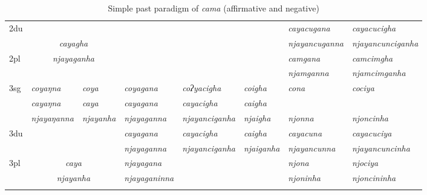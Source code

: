 \begin{sidewaystable}[p]
{\begin{tabular}{l|p{2.4cm}|p{1.5cm}|p{2.4cm}|p{2.4cm}|p{2.4cm}|p{3.2cm}|p{3.2cm}}
 \cline{1-2} \cline{7-8}			
{\sc 2du}		& \multicolumn{2}{c|}{}     & \multicolumn{3}{c|}{\cellcolor[gray]{.8}} & \it  cayacugana  & \it   cayacucigha \\
		& \multicolumn{2}{c|}{\it cayagha} & \multicolumn{3}{c|}{ \cellcolor[gray]{.8}}& \it njayancuganna  & \it  njayancunciganha \\
 \cline{1-1} \cline{7-8}			
{\sc 2pl}	& \multicolumn{2}{c|}{\it njayaganha} & \multicolumn{3}{c|}{\cellcolor[gray]{.8} }& \it  camgana& \it  camcimgha  \\
		& 	\multicolumn{2}{c|}{ }& \multicolumn{3}{c|}{\cellcolor[gray]{.8} }& \it  njamganna & \it  njamcimganha \\
\hline			
{\sc 3sg}	& \it coyaŋna	\ti  & \it 	 coya   \ti  	& \it   	coyagana		\ti & \it   coʔyacigha \ti  & \it   coigha \ti 	& \it cona & \it cociya \\
					& \it cayaŋna	  & \it 	      caya	& \it  cayagana 			& \it  cayacigha   & \it   caigha	& \it  & \it  \\
					& \it  njayaŋanna   & \it   njayanha 	& \it  njayaganna& \it  njayanciganha & \it  njaigha  & \it njonna& \it njoncinha\\
\hline
{\sc 3du }		&  \multicolumn{2}{c|}{}& \it cayagana& \it cayacigha & \it    caigha& \it   cayacuna & \it   cayacuciya\\
		& \multicolumn{2}{c|}{}& \it   	njayaganna	& \it njayanciganha	& \it  njaiganha& \it  njayancunna & \it njayancuncinha \\
 \cline{1-1} \cline{4-4} \cline{7-8}	
{\sc 3pl}		& \multicolumn{2}{c|}{\it caya}& \it njayagana& \it & \it  & \it njona& \it njociya\\	
	& \multicolumn{2}{c|}{\it  njayanha}			& \it njayaganinna& \it  & \it  & \it njoninha& \it njoncininha \\
\lspbottomrule
\end{tabular}
}

\caption{Simple past  paradigm of \emph{cama}  (affirmative and negative)}\label{par-cama-pst}
\end{sidewaystable}


